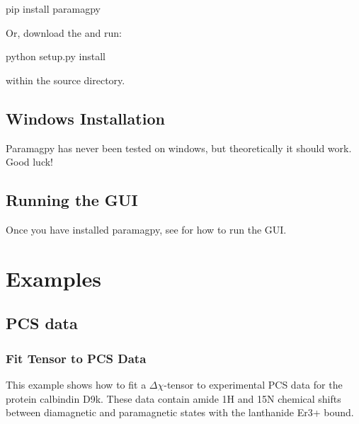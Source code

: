 \documentclass[a4paper,10pt,english,openany,oneside]{sphinxmanual}
\begin{document}
%
\begin{sphinxVerbatim}[commandchars=\\\{\}]
\PYGZdl{} pip install paramagpy
\end{sphinxVerbatim}

Or, download the  and run:

%
\begin{sphinxVerbatim}[commandchars=\\\{\}]
\PYGZdl{} python setup.py install
\end{sphinxVerbatim}

within the source directory.


\subsection{Windows Installation}
\label{\detokenize{install:windows-installation}}
Paramagpy has never been tested on windows, but theoretically it should work. Good luck!


\subsection{Running the GUI}
\label{\detokenize{install:running-the-gui}}
Once you have installed paramagpy, see {\hyperref[\detokenize{paramagpy_gui:paramagpy-gui}]{}} for how to run the GUI.


\section{Examples}
\label{\detokenize{examples/index:examples}}\label{\detokenize{examples/index:examples-index}}\label{\detokenize{examples/index::doc}}

\subsection{PCS data}
\label{\detokenize{examples/index:pcs-data}}

\subsubsection{Fit Tensor to PCS Data}
\label{\detokenize{examples/pcs_fit:fit-tensor-to-pcs-data}}\label{\detokenize{examples/pcs_fit:pcs-fit}}\label{\detokenize{examples/pcs_fit::doc}}
This example shows how to fit a \({\Delta\chi}\)-tensor to experimental PCS data for the protein calbindin D9k. These data contain amide 1H and 15N chemical shifts between diamagnetic and paramagnetic states with the lanthanide Er3+ bound.
\end{document}
